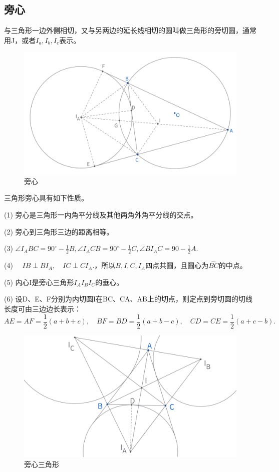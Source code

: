 \subsection{旁心}
\begin{definition}[旁心]
    与三角形一边外侧相切，又与另两边的延长线相切的圆叫做三角形的旁切圆，通常用J，或者$I_a,I_b,I_c$表示。    
\end{definition}



\begin{figure}[htbp]
    \centering
    \includegraphics[width=0.6\linewidth]{figures/旁心.png}
    \caption{旁心}
\end{figure}


\begin{proposition}[旁心性质]
    三角形旁心具有如下性质。
    
    (1) 旁心是三角形一内角平分线及其他两角外角平分线的交点。

    (2) 旁心到三角形三边的距离相等。

    (3) $\angle I_ABC = 90^\circ - \frac{1}{2}B, \angle I_ACB = 90^\circ - \frac{1}{2}C, \angle BI_AC=90 - \frac{1}{2}A.$

    (4) $\quad IB\perp BI_A, \quad IC\perp CI_A.$，所以$B, I,C,I_A$四点共圆，且圆心为$\overset{\frown}{BC}$的中点。

    (5) 内心I是旁心三角形$I_AI_BI_C$的垂心。

    (6) 设D、E、F分别为内切圆I在BC、CA、AB上的切点，则定点到旁切圆的切线长度可由三边边长表示：
    $$
    AE=AF=\frac{1}{2}(a+b+c),\quad
    BF=BD=\frac{1}{2}(a+b-c),\quad 
    CD=CE=\frac{1}{2}(a+c - b).
    $$
\end{proposition}

\begin{figure}[ht]
    \centering
    \includegraphics[width=0.4\linewidth]{figures/旁心三角形.png}
    \caption{旁心三角形}
\end{figure}